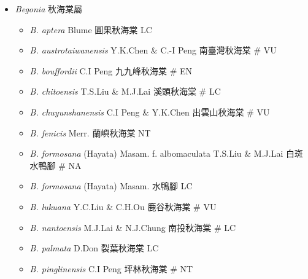 
  \begin{itemize}
 \item[] \textit{Begonia} 秋海棠屬
                                
  \begin{itemize}
        \item[] \textit{B. aptera} Blume  圓果秋海棠   LC
        \item[] \textit{B. austrotaiwanensis} Y.K.Chen \& C.-I Peng  南臺灣秋海棠  \# VU
        \item[] \textit{B. bouffordii} C.I Peng  九九峰秋海棠  \# EN
        \item[] \textit{B. chitoensis} T.S.Liu \& M.J.Lai  溪頭秋海棠  \# LC
        \item[] \textit{B. chuyunshanensis} C.I Peng \& Y.K.Chen  出雲山秋海棠  \# VU
        \item[] \textit{B. fenicis} Merr.  蘭嶼秋海棠   NT
        \item[] \textit{B. formosana} (Hayata) Masam. f. albomaculata T.S.Liu \& M.J.Lai  白斑水鴨腳  \# NA
        \item[] \textit{B. formosana} (Hayata) Masam.  水鴨腳   LC
        \item[] \textit{B. lukuana} Y.C.Liu \& C.H.Ou  鹿谷秋海棠  \# VU
        \item[] \textit{B. nantoensis} M.J.Lai \& N.J.Chung  南投秋海棠  \# LC
        \item[] \textit{B. palmata} D.Don  裂葉秋海棠   LC
        \item[] \textit{B. pinglinensis} C.I Peng  坪林秋海棠  \# NT

\end{itemize}
\end{itemize}
